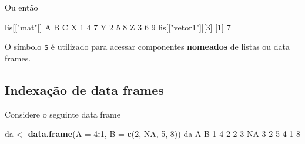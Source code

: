 \documentclass[10pt,a4paper]{book}
\newenvironment{Shaded}{\begin{snugshade}}{\end{snugshade}}
\newcommand{\KeywordTok}[1]{\textcolor[rgb]{0.13,0.29,0.53}{\textbf{#1}}}
\newcommand{\DataTypeTok}[1]{\textcolor[rgb]{0.13,0.29,0.53}{#1}}
\newcommand{\DecValTok}[1]{\textcolor[rgb]{0.00,0.00,0.81}{#1}}
\newcommand{\StringTok}[1]{\textcolor[rgb]{0.31,0.60,0.02}{#1}}
\newcommand{\OtherTok}[1]{\textcolor[rgb]{0.56,0.35,0.01}{#1}}
\newcommand{\OperatorTok}[1]{\textcolor[rgb]{0.81,0.36,0.00}{\textbf{#1}}}
\newcommand{\NormalTok}[1]{#1}
\begin{document}
\begin{Shaded}
\end{Shaded}

Ou então

\begin{Shaded}
\begin{Highlighting}[]
\NormalTok{lis[[}\StringTok{"mat"}\NormalTok{]]}
\NormalTok{  A B C}
\NormalTok{X }\DecValTok{1} \DecValTok{4} \DecValTok{7}
\NormalTok{Y }\DecValTok{2} \DecValTok{5} \DecValTok{8}
\NormalTok{Z }\DecValTok{3} \DecValTok{6} \DecValTok{9}
\NormalTok{lis[[}\StringTok{"vetor1"}\NormalTok{]][}\DecValTok{3}\NormalTok{]}
\NormalTok{[}\DecValTok{1}\NormalTok{] }\DecValTok{7}
\end{Highlighting}
\end{Shaded}

O símbolo \texttt{\$} é utilizado para acessar componentes
\textbf{nomeados} de listas ou data frames.

\subsection{Indexação de data frames}\label{indexacao-de-data-frames}

Considere o seguinte data frame

\begin{Shaded}
\begin{Highlighting}[]
\NormalTok{da <-}\StringTok{ }\KeywordTok{data.frame}\NormalTok{(}\DataTypeTok{A =} \DecValTok{4}\OperatorTok{:}\DecValTok{1}\NormalTok{, }\DataTypeTok{B =} \KeywordTok{c}\NormalTok{(}\DecValTok{2}\NormalTok{, }\OtherTok{NA}\NormalTok{, }\DecValTok{5}\NormalTok{, }\DecValTok{8}\NormalTok{))}
\NormalTok{da}
\NormalTok{  A  B}
\DecValTok{1} \DecValTok{4}  \DecValTok{2}
\DecValTok{2} \DecValTok{3} \OtherTok{NA}
\DecValTok{3} \DecValTok{2}  \DecValTok{5}
\DecValTok{4} \DecValTok{1}  \DecValTok{8}
\end{Highlighting}
\end{Shaded}
\end{document}
